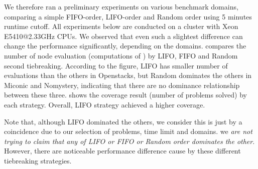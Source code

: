 We therefore ran a preliminary experiments on various benchmark domains, comparing a simple FIFO-order, LIFO-order and Random order using 5 minutes runtime cutoff. 
All experiments below are conducted on a cluster with Xeon E5410@2.33GHz CPUs.
We observed that even such a slightest difference can change the performance significantly, depending on the domains.
 compares the number of node evaluation (computations of \lmcut)
by LIFO, FIFO and Random second tiebreaking.
According to the figure, LIFO has smaller number of evaluations than the others in Openstacks, but Random dominates the others in Miconic and Nomystery, indicating that there are no dominance relationship between these three.
 shows the coverage result (number of problems solved) by each strategy.
Overall, LIFO strategy achieved a higher coverage.

Note that, although LIFO dominated the others, we consider this is just by a coincidence due to our selection of problems, time limit and domains. we \emph{are not trying to claim that any of LIFO or FIFO or Random order dominates the other}. However, there are noticeable performance difference cause by these different tiebreaking strategies.

